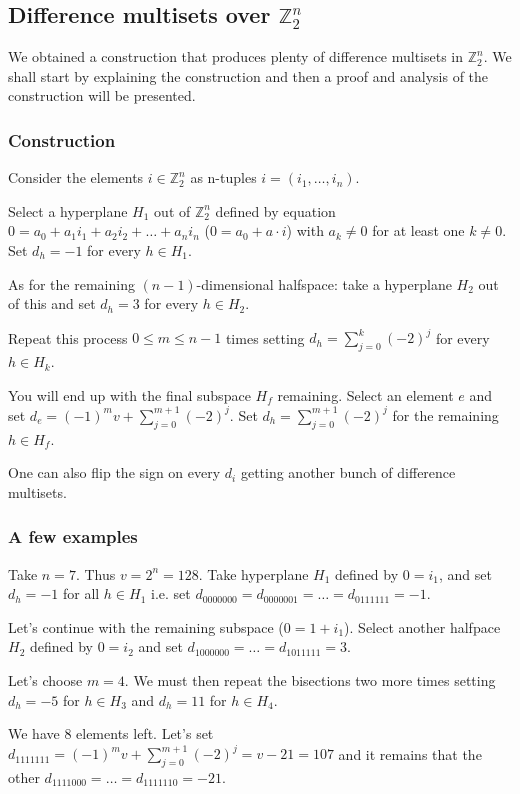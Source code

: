\subsection{Difference multisets over $\mathbb Z_2^n$}
    \label{sec:z2n}
    We obtained a construction that produces plenty of difference multisets in $\mathbb Z_2^n$. We shall start by explaining the construction and then a proof and analysis of the construction will be presented.

    \subsubsection{Construction}
        Consider the elements $i \in \mathbb Z_2^n$ as n-tuples $i=(i_1, \ldots, i_n)$.
        
        Select a hyperplane $H_1$ out of $\mathbb Z_2^n$ defined by equation $0 = a_0 + a_1 i_1 + a_2 i_2 + \ldots + a_n i_n$ ($0=a_0+a\cdot i$) with $a_k \neq 0$ for at least one $k \neq 0$. Set $d_h = -1$ for every $h \in H_1$.
        
        As for the remaining $(n-1)$-dimensional halfspace: take a hyperplane $H_2$ out of this and set $d_h = 3$ for every $h \in H_2$.
        
        Repeat this process $0 \leq m \leq n-1$ times setting $d_h = \sum\limits_{j=0}^k (-2)^j$ for every $h \in H_k$.
        
        You will end up with the final subspace $H_f$ remaining. Select an element $e$ and set $d_e = (-1)^m v + \sum\limits_{j=0}^{m+1} (-2)^j$. Set $d_h = \sum\limits_{j=0}^{m+1} (-2)^j$ for the remaining $h \in H_f$.
        
        One can also flip the sign on every $d_i$ getting another bunch of difference multisets.
        
    \subsubsection{A few examples}
        
        \begin{example}
            Take $n=7$. Thus $v=2^n=128$. Take hyperplane $H_1$ defined by $0=i_1$, and set $d_h=-1$ for all $h\in H_1$ i.e. set $d_{0000000}=d_{0000001}=\ldots=d_{0111111}=-1$.
            
            Let's continue with the remaining subspace ($0=1+i_1$). Select another halfpace $H_2$ defined by $0=i_2$ and set $d_{1000000}=\ldots=d_{1011111}=3$.
            
            Let's choose $m=4$. We must then repeat the bisections two more times setting $d_h=-5$ for $h\in H_3$ and $d_h=11$ for $h \in H_4$.
            
            We have 8 elements left. Let's set $d_{1111111} = (-1)^{m} v + \sum\limits_{j=0}^{m+1} (-2)^j = v - 21 = 107$ and it remains that the other $d_{1111000}=\ldots=d_{1111110}=-21$.
        \end{example}
        

